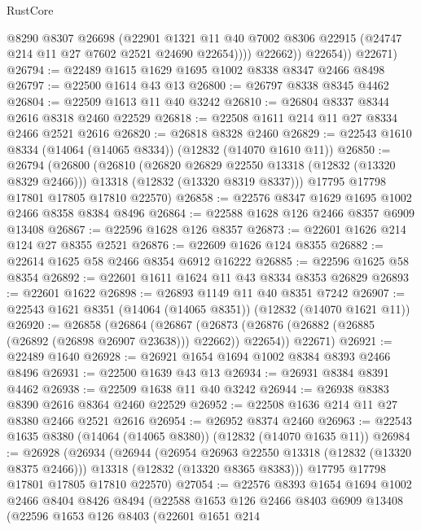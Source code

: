 \begin{lexlean}{RustCore}
\begin{coremodule}
                  @8290
                  @8307
                  @26698
                  (@22901
                    @1321
                    @11
                    @40
                    @7002
                    @8306
                    @22915
                    (@24747 @214 @11 @27 @7602 @2521 @24690 @22654))))
              @22662))
          @22654))
      @22671)
@26794 := @22489 @1615 @1629 @1695 @1002 @8338 @8347 @2466 @8498
@26797 := @22500 @1614 @43 @13
@26800 := @26797 @8338 @8345 @4462
@26804 := @22509 @1613 @11 @40 @3242
@26810 := @26804 @8337 @8344 @2616 @8318 @2460 @22529
@26818 := @22508 @1611 @214 @11 @27 @8334 @2466 @2521 @2616
@26820 := @26818 @8328 @2460
@26829 := @22543 @1610 @8334 (@14064 (@14065 @8334)) (@12832 (@14070 @1610 @11))
@26850 := @26794
    (@26800
      (@26810
        (@26820 @26829 @22550 @13318 (@12832 (@13320 @8329 @2466)))
        @13318
        (@12832 (@13320 @8319 @8337)))
      @17795
      @17798
      @17801
      @17805
      @17810
      @22570)
@26858 := @22576 @8347 @1629 @1695 @1002 @2466 @8358 @8384 @8496
@26864 := @22588 @1628 @126 @2466 @8357 @6909 @13408
@26867 := @22596 @1628 @126 @8357
@26873 := @22601 @1626 @214 @124 @27 @8355 @2521
@26876 := @22609 @1626 @124 @8355
@26882 := @22614 @1625 @58 @2466 @8354 @6912 @16222
@26885 := @22596 @1625 @58 @8354
@26892 := @22601 @1611 @1624 @11 @43 @8334 @8353 @26829
@26893 := @22601 @1622
@26898 := @26893 @1149 @11 @40 @8351 @7242
@26907 := @22543 @1621 @8351 (@14064 (@14065 @8351)) (@12832 (@14070 @1621 @11))
@26920 := @26858
    (@26864
      (@26867 (@26873 (@26876 (@26882 (@26885 (@26892 (@26898 @26907 @23638))) @22662)) @22654))
      @22671)
@26921 := @22489 @1640
@26928 := @26921 @1654 @1694 @1002 @8384 @8393 @2466 @8496
@26931 := @22500 @1639 @43 @13
@26934 := @26931 @8384 @8391 @4462
@26938 := @22509 @1638 @11 @40 @3242
@26944 := @26938 @8383 @8390 @2616 @8364 @2460 @22529
@26952 := @22508 @1636 @214 @11 @27 @8380 @2466 @2521 @2616
@26954 := @26952 @8374 @2460
@26963 := @22543 @1635 @8380 (@14064 (@14065 @8380)) (@12832 (@14070 @1635 @11))
@26984 := @26928
    (@26934
      (@26944
        (@26954 @26963 @22550 @13318 (@12832 (@13320 @8375 @2466)))
        @13318
        (@12832 (@13320 @8365 @8383)))
      @17795
      @17798
      @17801
      @17805
      @17810
      @22570)
@27054 := @22576
    @8393
    @1654
    @1694
    @1002
    @2466
    @8404
    @8426
    @8494
    (@22588
      @1653
      @126
      @2466
      @8403
      @6909
      @13408
      (@22596
        @1653
        @126
        @8403
        (@22601
          @1651
          @214

\end{coremodule}
\end{lexlean}
